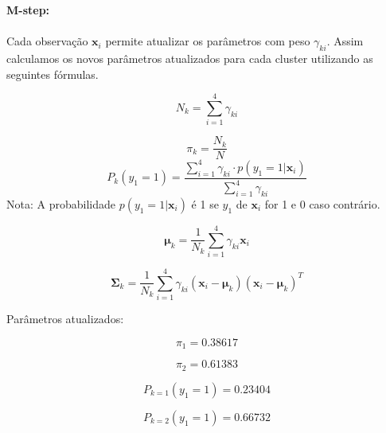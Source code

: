 \documentclass[a4paper,12pt]{article} %
\begin{document}
\begin{enumerate}
\textbf{M-step:} \\ \\
Cada observação $\mathbf{x}_i$ permite atualizar os parâmetros com peso $\gamma_{ki}$. 
Assim calculamos os novos parâmetros atualizados para cada cluster utilizando as seguintes fórmulas. 

\begin{equation}
    N_k = \sum_{i=1}^4 \gamma_{ki}
\end{equation}

\begin{equation}
    \pi_k = \frac{N_k}{N}
\end{equation}
\begin{equation}
    P_k(y_1=1) = \frac{\sum_{i=1}^4 \gamma_{ki} \cdot p(y_1=1|\mathbf{x}_i)}{\sum_{i=1}^4 \gamma_{ki}} 
\end{equation}
Nota: A probabilidade $p(y_1=1|\mathbf{x}_i)$ é 1 se $y_1$ de $\mathbf{x}_i$ for 1 e 0 caso contrário. 

\begin{equation}
    \boldsymbol{\mu}_k = \frac{1}{N_k} \sum_{i=1}^4 \gamma_{ki} \mathbf{x}_i    
\end{equation}

\begin{equation}
    \boldsymbol{\Sigma}_k = \frac{1}{N_k} \sum_{i=1}^4 \gamma_{ki} (\mathbf{x}_i - \boldsymbol{\mu}_k)(\mathbf{x}_i - \boldsymbol{\mu}_k)^T
\end{equation}


Parâmetros atualizados:

\begin{equation*}
    \pi_1 = 0.38617
\end{equation*}

\begin{equation*}
    \pi_2 = 0.61383
\end{equation*}

\begin{equation*}
    P_{k=1}(y_1=1) = 0.23404
\end{equation*}

\begin{equation*}
    P_{k=2}(y_1=1) = 0.66732
\end{equation*}


\end{enumerate}
\end{document}
